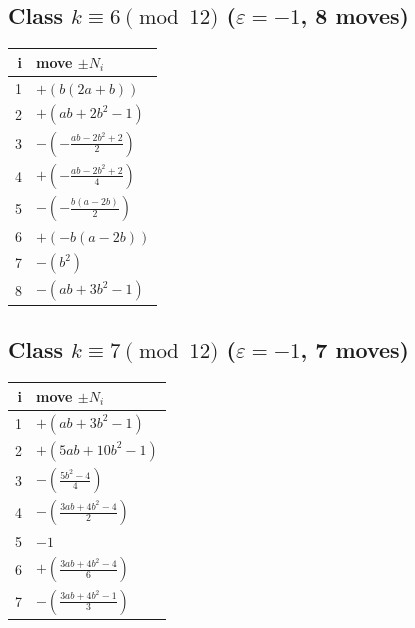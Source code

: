 \subsection*{Class $k\equiv 6\pmod{12}$ \quad ($\varepsilon=-1$, 8 moves)}
\begin{center}\renewcommand{\arraystretch}{1.35}\begin{tabular}{@{}r@{\quad}l@{}}\toprule
i & move $\pm N_i$ \\\midrule
1 & $+(b \left(2 a + b\right))$ \\
2 & $+(a b + 2 b^{2} - 1)$ \\
3 & $-(- \frac{a b - 2 b^{2} + 2}{2})$ \\
4 & $+(- \frac{a b - 2 b^{2} + 2}{4})$ \\
5 & $-(- \frac{b \left(a - 2 b\right)}{2})$ \\
6 & $+(- b \left(a - 2 b\right))$ \\
7 & $-(b^{2})$ \\
8 & $-(a b + 3 b^{2} - 1)$ \\
\bottomrule\end{tabular}\end{center}

\subsection*{Class $k\equiv 7\pmod{12}$ \quad ($\varepsilon=-1$, 7 moves)}
\begin{center}\renewcommand{\arraystretch}{1.35}\begin{tabular}{@{}r@{\quad}l@{}}\toprule
i & move $\pm N_i$ \\\midrule
1 & $+(a b + 3 b^{2} - 1)$ \\
2 & $+(5 a b + 10 b^{2} - 1)$ \\
3 & $-(\frac{5 b^{2} - 4}{4})$ \\
4 & $-(\frac{3 a b + 4 b^{2} - 4}{2})$ \\
5 & $-1$ \\
6 & $+(\frac{3 a b + 4 b^{2} - 4}{6})$ \\
7 & $-(\frac{3 a b + 4 b^{2} - 1}{3})$ \\
\bottomrule\end{tabular}\end{center}

